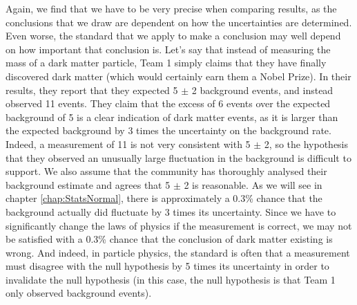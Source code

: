 Again, we find that we have to be very precise when comparing results, as the conclusions that we draw are dependent on how the uncertainties are determined. Even worse, the standard that we apply to make a conclusion may well depend on how important that conclusion is. Let's say that instead of measuring the mass of a dark matter particle, Team 1 simply claims that they have finally discovered dark matter (which would certainly earn them a Nobel Prize). In their results, they report that they expected 5 $\pm$ 2 background events, and instead observed 11 events. They claim that the excess of 6 events over the expected background of 5 is a clear indication of dark matter events, as it is larger than the expected background by 3 times the uncertainty on the background rate. Indeed, a measurement of 11 is not very consistent with 5 $\pm$ 2, so the hypothesis that they observed an unusually large fluctuation in the background is difficult to support. We also assume that the community has thoroughly analysed their background estimate and agrees that 5 $\pm$ 2 is reasonable. As we will see in chapter \ref{chap:StatsNormal}, there is approximately a 0.3\% chance that the background actually did fluctuate by 3 times its uncertainty. Since we have to significantly change the laws of physics if the measurement is correct, we may not be satisfied with a 0.3\% chance that the conclusion of dark matter existing is wrong. And indeed, in particle physics, the standard is often that a measurement must disagree with the null hypothesis by 5 times its uncertainty in order to invalidate the null hypothesis (in this case, the null hypothesis is that Team 1 only observed background events).
\newpage
